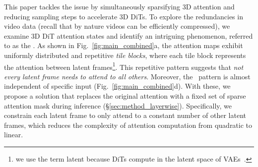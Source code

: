 This paper tackles the issue by simultaneously sparsifying 3D attention and reducing sampling steps to accelerate 3D DiTs. 
To explore the redundancies in video data (recall that by nature videos can be efficiently compressed), we examine  3D DiT attention states and identify an intriguing phenomenon, referred to as the \patternname. 
As shown in Fig.~\ref{fig:main_combined}a, the attention maps exhibit uniformly distributed and repetitive \textit{tile blocks}, where each tile block represents the attention between latent frames\footnote{we use the term latent because DiTs compute in the latent space of VAEs~\citep{rombach2022high}.}. %
This repetitive pattern suggests that \emph{not every latent frame needs to attend to all others}.
Moreover, the \patternname~pattern is almost independent of specific input (Fig.~\ref{fig:main_combined}d).
With these, we propose a solution that replaces the original attention with a fixed set of sparse attention mask during inference (\S \ref{sec:method_layerwise}).
Specifically, we constrain each latent frame to only attend to a constant number of other latent frames, which reduces the complexity of attention computation from quadratic to linear.


